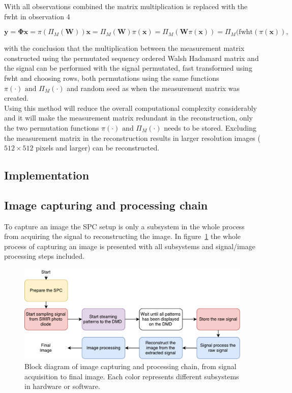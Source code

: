 With all observations combined the matrix multiplication is replaced with the fwht in observation 4

\begin{equation}
\mathbf{y} = \mathbf{\Phi}\mathbf{x} = \pi(\Pi_M(\mathbf{W}))\mathbf{x} = \Pi_M(\mathbf{W})\pi(\mathbf{x}) = \Pi_M(\mathbf{W}\pi(\mathbf{x})) = \Pi_M(\text{fwht}(\pi(\mathbf{x}))\text{,}
\end{equation}

with the conclusion that the multiplication between the measurement matrix constructed using the permutated sequency ordered Walsh Hadamard matrix and the signal can be performed with the signal permutated, fast transformed using fwht and choosing rows, both permutations using the same functions $\pi(\cdot) \text{ and } \Pi_M(\cdot)$ and random seed as when the measurement matrix was created.\\[0.1in]

Using this method will reduce the overall computational complexity considerably and it will make the measurement matrix redundant in the reconstruction, only the two permutation functions $\pi(\cdot) \text{ and } \Pi_M(\cdot)$ needs to be stored. Excluding the measurement matrix in the reconstruction results in larger resolution images ($512\times512$ pixels and larger) can be reconstructed.

\subsection{Implementation}


\subsection{Image capturing and processing chain}
To capture an image the SPC setup is only a subsystem in the whole process from acquiring the signal to reconstructing the image. In figure~\ref{fig:flow_chart} the whole process of capturing an image is presented with all subsystems and signal/image processing steps included.

\begin{figure}[H]
\includegraphics[width = 1\linewidth]{gfx/flowchart3.pdf}
\caption{Block diagram of image capturing and processing chain, from signal acquisition to final image. Each color represents different subsystems in hardware or software.}
	\label{fig:flow_chart}
\end{figure}

